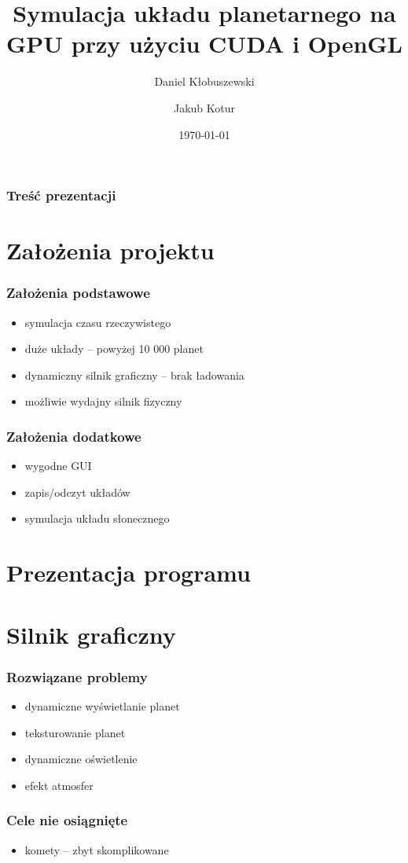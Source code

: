 \documentclass{beamer}
\title{Symulacja układu planetarnego na GPU przy użyciu CUDA i OpenGL}
\author{Daniel Kłobuszewski\and Jakub Kotur}
\institute{{\normalsize Promotor: Krzysztof Kaczmarski}\\\vspace{1cm} Politechnika Warszawska}
\date{\today}
\begin{document}
\frame{\titlepage}

\frame
{
	\frametitle{Treść prezentacji}
	\tableofcontents
}

\section{Założenia projektu}\label{sec:zalozenia}

\frame
{
	\frametitle{Założenia podstawowe}
	\begin{itemize}
	\item symulacja czasu rzeczywistego
	\item duże układy -- powyżej 10 000 planet
	\item dynamiczny silnik graficzny -- brak ładowania
	\item możliwie wydajny silnik fizyczny
	\end{itemize}
}

\frame
{
	\frametitle{Założenia dodatkowe}
	\begin{itemize}
	\item wygodne GUI
	\item zapis/odczyt układów
	\item symulacja układu słonecznego
	\end{itemize}
}
	

\section{Prezentacja programu}\label{sec:prezentacja programu}


\section{Silnik graficzny}\label{sec:silnik graficzny}

\frame
{
	\tableofcontents[currentsection]
}

\frame
{
	\frametitle{Rozwiązane problemy}
	\begin{itemize}
	\item dynamiczne wyświetlanie planet
	\item teksturowanie planet
	\item dynamiczne oświetlenie
	\item efekt atmosfer
	\end{itemize}
}

\frame
{
	\frametitle{Cele nie osiągnięte}
	\begin{itemize}
	\item komety -- zbyt skomplikowane
	\end{itemize}
}
\end{document}
